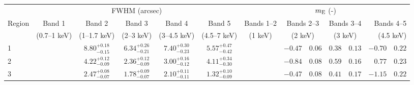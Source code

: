 \begin{tabular}{@{}l ccccc r@{ $\pm$ }l r@{ $\pm$ }l r@{ $\pm$ }l r@{ $\pm$ }l @{}}

\toprule
{} & \multicolumn{5}{c}{FWHM (arcsec)} & \multicolumn{8}{c}{$m_\mathrm{E}$ (-)} \\
\cmidrule(lr){2-6} \cmidrule(l){7-14}
Region & Band 1 & Band 2 & Band 3 & Band 4 & Band 5
       & \multicolumn{2}{c}{Bands 1--2} & \multicolumn{2}{c}{Bands 2--3}
       & \multicolumn{2}{c}{Bands 3--4} & \multicolumn{2}{r}{Bands 4--5} \\ [0.2em]
{} & (0.7--1 keV) & (1--1.7 keV) & (2--3 keV) & (3--4.5 keV) & (4.5--7 keV)
   & \multicolumn{2}{c}{(1 keV)} & \multicolumn{2}{c}{(2 keV)}
   & \multicolumn{2}{c}{(3 keV)} & \multicolumn{2}{r}{(4.5 keV)} \\
\midrule
1 & {} & ${8.80}^{+0.18}_{-0.15}$ & ${6.34}^{+0.26}_{-0.21}$ & ${7.40}^{+0.30}_{-0.23}$ & ${5.57}^{+0.47}_{-0.42}$
  & \multicolumn{2}{c}{} & $-0.47$ & $0.06$ & $0.38$ & $0.13$ & $-0.70$ & $0.22$ \\ [0.5em]
2 & {} & ${4.22}^{+0.12}_{-0.09}$ & ${2.36}^{+0.12}_{-0.09}$ & ${3.00}^{+0.16}_{-0.12}$ & ${4.11}^{+0.34}_{-0.30}$
  & \multicolumn{2}{c}{} & $-0.84$ & $0.08$ & $0.59$ & $0.16$ & $0.77$ & $0.23$ \\ [0.5em]
3 & {} & ${2.47}^{+0.08}_{-0.07}$ & ${1.78}^{+0.09}_{-0.07}$ & ${2.10}^{+0.11}_{-0.11}$ & ${1.32}^{+0.10}_{-0.09}$
  & \multicolumn{2}{c}{} & $-0.47$ & $0.08$ & $0.41$ & $0.17$ & $-1.15$ & $0.22$ \\


\end{tabular}
